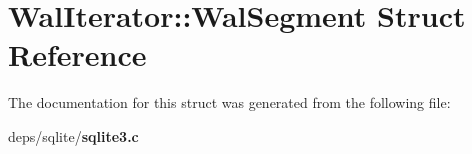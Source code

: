 \section{Wal\-Iterator::Wal\-Segment Struct Reference}
\label{structWalIterator_1_1WalSegment}


The documentation for this struct was generated from the following file:\begin{CompactItemize}
\item 
deps/sqlite/\bf{sqlite3.c}\end{CompactItemize}
